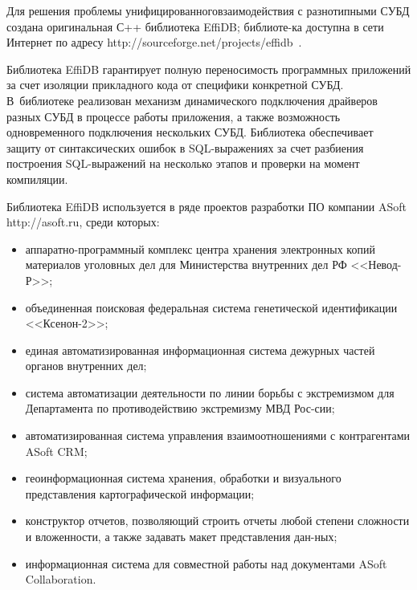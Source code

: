 \begin{multicols}{2}
Для решения проблемы унифицированного\linebreak взаимодействия с разнотипными СУБД 
создана оригинальная С++ библиотека EffiDB; библиоте-\linebreak ка доступна в сети Интернет по 
адресу {\sf http://\linebreak sourceforge.net/projects/effidb}~\cite{7-y}.

Библиотека EffiDB гарантирует полную переносимость программных приложений за счет изоляции 
прикладного кода от специфики конкретной СУБД. В~библиотеке реализован механизм 
динамического подключения драйверов разных СУБД в процессе работы приложения, а 
также возможность одновременного подключения нескольких СУБД. Библиотека 
обеспечивает защиту от синтаксических ошибок в SQL-выражениях за счет разбиения 
построения SQL-выражений на несколько этапов и проверки на момент компиляции.

Библиотека EffiDB используется в ряде проектов разработки ПО 
компании ASoft {\sf http://asoft.ru}, среди которых:
\begin{itemize}
\item аппаратно-программный комплекс центра хранения электронных копий 
материалов уголовных дел для Министерства внутренних дел РФ <<Невод-Р>>;
\item объединенная поисковая федеральная система генетической идентификации 
<<Ксенон-2>>;
\item единая автоматизированная информационная система дежурных частей органов 
внутренних дел;\\[-5pt]
\item система автоматизации деятельности по линии борьбы с экстремизмом для 
Департамента по противодействию экстремизму МВД Рос-\linebreak сии;\\[-5pt]
\item автоматизированная система управления взаимоотношениями с контрагентами 
ASoft CRM;\\[-5pt]
\item геоинформационная система хранения, обработки и визуального представления 
картографической информации;\\[-5pt]
\item конструктор отчетов, позволяющий строить отчеты любой степени сложности и 
вложенности, а также задавать макет представления дан-\linebreak ных;\\[-5pt]
\item информационная система для совместной работы над документами ASoft 
Collaboration.
\end{itemize}


\end{multicols}
